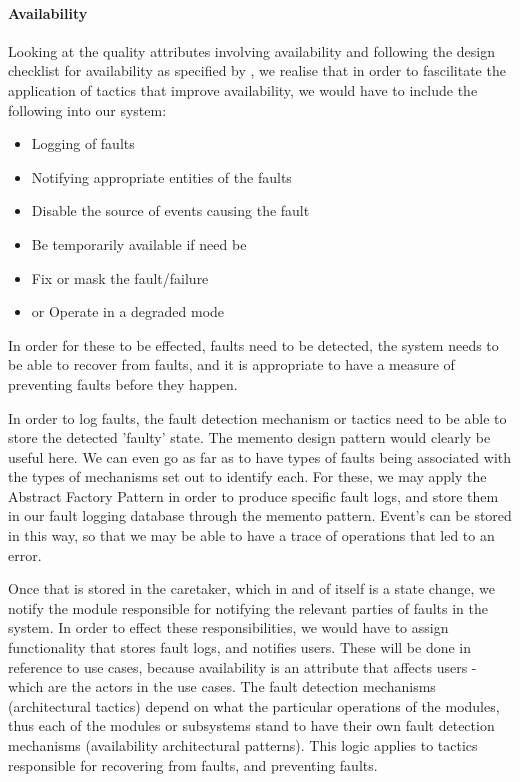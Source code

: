 \documentclass[11pt]{article}
\begin{document}
\paragraph{Availability}
Looking at the quality attributes involving availability and following the design checklist for availability as specified by \cite{Book:2}, we realise that in order to fascilitate the application of tactics that improve availability, we would have to include the following into our system:
\begin{itemize}
	\item[] Logging of faults
	\item[] Notifying appropriate entities of the faults
	\item[] Disable the source of events causing the fault
	\item[] Be temporarily available if need be
	\item[] Fix or mask the fault/failure
	\item[] or Operate in a degraded mode
\end{itemize}

In order for these to be effected, faults need to be detected, the system needs to be able to recover from faults, and it is appropriate to have a measure of preventing faults before they happen.

In order to log faults, the fault detection mechanism or tactics need to be able to store the detected 'faulty' state. The memento design pattern would clearly be useful here. We can even go as far as to have types of faults being associated with the types of mechanisms set out to identify each. For these, we may apply the Abstract Factory Pattern in order to produce specific fault logs, and store them in our fault logging database through the memento pattern. Event's can be stored in this way, so that we may be able to have a trace of operations that led to an error.

Once that is stored in the caretaker, which in and of itself is a state change, we notify the module responsible for notifying the relevant parties of faults in the system. In order to effect these responsibilities, we would have to assign functionality that stores fault logs, and notifies users. These will be done in reference to use cases, because availability is an attribute that affects users - which are the actors in the use cases. The fault detection mechanisms (architectural tactics) depend on what the particular operations of the modules, thus each of the modules or subsystems stand to have their own fault detection mechanisms (availability architectural patterns). This logic applies to tactics responsible for recovering from faults, and preventing faults.
\end{document}
